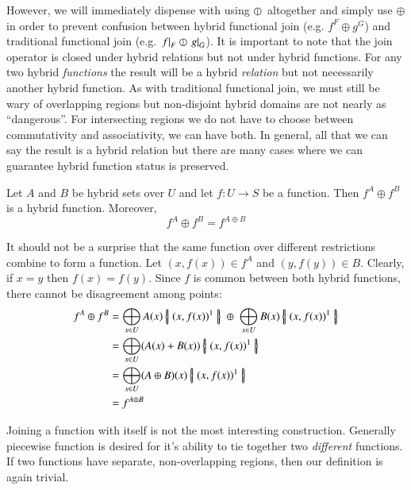 However, we will immediately dispense with using $\varobar^{}$ altogether and simply use $\oplus$ 
in order to prevent confusion between hybrid functional join (e.g. $f^F \oplus g^G$) and 
traditional functional join (e.g. $\left.f\right|_{F} \varobar \left.g\right|_{G}$).
It is important to note that the join operator is closed under hybrid relations but not under hybrid functions.
For any two hybrid \emph{functions} the result will be a hybrid \emph{relation} 
but not necessarily another hybrid function.
As with traditional functional join, we must still be wary of overlapping regions
 but non-disjoint hybrid domains are not nearly as ``dangerous''.
For intersecting regions we do not have to choose between commutativity and associativity, we can have both.
In general, all that we can say the result is a hybrid relation but there are many cases where we can guarantee hybrid function status is preserved.


\begin{theorem}
	\label{thm:compatible1}
	Let $A$ and $B$ be hybrid sets over $U$ and let $f: U \to S$ be a function.
	Then $f^A \oplus f^B$ is a hybrid function.
	Moreover,
	\begin{equation}
		f^A \oplus f^B = f^{A \oplus B}
	\end{equation}
\end{theorem}


It should not be a surprise that the same function over different restrictions combine to form a function.
Let $(x,f(x)) \in f^A$ and $(y,f(y)) \in B$. Clearly, if $x=y$ then $f(x)=f(y)$. 
Since $f$ is common between both hybrid functions, there cannot be disagreement among points:
\begin{align*}
	f^A \oplus f^B 
		&= \bigoplus_{x \in U} A(x) \hset{ (x, f(x) )^1 } 
			\; \oplus \; \bigoplus_{x \in U} B(x) \hset{ (x, f(x) )^1 } \\
		&= \bigoplus_{x \in U} (A(x) + B(x)) \hset{ (x, f(x) )^1 } \\
		&= \bigoplus_{x \in U} (A \oplus B)(x) \hset{ (x, f(x) )^1 } \\ 
		&= f^{A \oplus B}
\end{align*}



Joining a function with itself is not the most interesting construction.
Generally piecewise function is desired for it's ability to tie together two \emph{different} functions.
If two functions have separate, non-overlapping regions, then our definition is again trivial.


